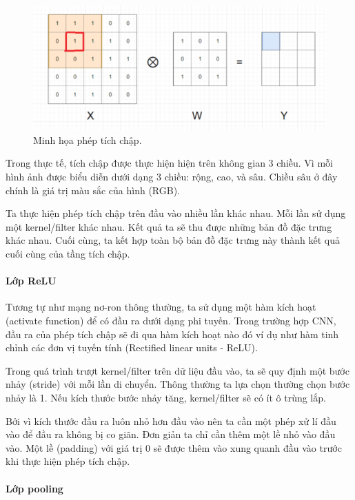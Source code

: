\begin{figure}[H]
	\centering
	\includegraphics[width=1\linewidth]{images/padding18.png}
	\caption{Minh họa phép tích chập.}
	\label{fig:padding18}
\end{figure}

Trong thực tế, tích chập được thực hiện hiện trên không gian 3 chiều. Vì mỗi hình ảnh được biểu diễn dưới dạng 3 chiều: rộng, cao, và sâu. Chiều sâu ở đây chính là giá trị màu sắc của hình (RGB).

Ta thực hiện phép tích chập trên đầu vào nhiều lần khác nhau. Mỗi lần sử dụng một kernel/filter khác nhau. Kết quả ta sẽ thu được những bản đồ đặc trưng khác nhau. Cuối cùng, ta kết hợp toàn bộ bản đồ đặc trưng này thành kết quả cuối cùng của tầng tích chập.

\paragraph{Lớp ReLU}

Tương tự như mạng nơ-ron thông thường, ta sử dụng một hàm kích hoạt (activate function) để có đầu ra dưới dạng phi tuyến. Trong trường hợp CNN, đầu ra của phép tích chập sẽ đi qua hàm kích hoạt nào đó ví dụ như hàm tinh chỉnh các đơn vị tuyến tính (Rectified linear units - ReLU). 

Trong quá trình trượt kernel/filter trên dữ liệu đầu vào, ta sẽ quy định một bước nhảy (stride) với mỗi lần di chuyển. Thông thường ta lựa chọn thường chọn bước nhảy là 1. Nếu kích thước bước nhảy tăng, kernel/filter sẽ có ít ô trùng lắp.

Bởi vì kích thước đầu ra luôn nhỏ hơn đầu vào nên ta cần một phép xử lí đầu vào để đầu ra không bị co giãn. Đơn giản ta chỉ cần thêm một lề nhỏ vào đầu vào. Một lề (padding) với giá trị 0 sẽ được thêm vào xung quanh đầu vào trước khi thực hiện phép tích chập. 

\paragraph{Lớp pooling}

